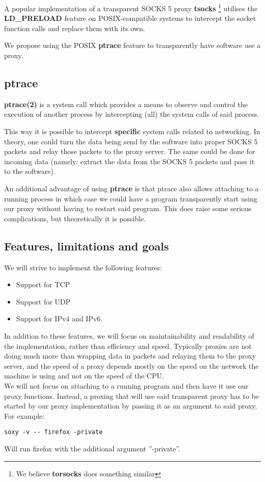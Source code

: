 \documentclass[a4paper]{article}
\begin{document}
A popular implementation of a transparent SOCKS 5 proxy \textbf{tsocks}
\footnote{We believe \textbf{torsocks} does something similar}
utilises the \textbf{LD\_PRELOAD} feature on POSIX-compatible systems to
intercept the socket function calls and replace them with its own.

We propose using the POSIX \textbf{ptrace} feature to transparently have
software use a proxy.

\subsection{ptrace}

\textbf{ptrace(2)} is a system call which provides a means to observe and
control the execution of another process by intercepting (all) the system calls
of said process.

This way it is possible to intercept \textbf{specific} system calls related to
networking. In theory, one could turn the data being send by the software into
proper SOCKS 5 packets and relay those packets to the proxy server. The same
could be done for incoming data (namely: extract the data from the SOCKS 5
packets and pass it to the software).

An additional advantage of using \textbf{ptrace} is that ptrace also allows
attaching to a running process in which case we could have a program
transparently start using our proxy without having to restart said program. This
does raise some serious complications, but theoretically it is possible.

\subsection{Features, limitations and goals}

We will strive to implement the following features:

\begin{itemize}
\item Support for TCP
\item Support for UDP
\item Support for IPv4 and IPv6.
\end{itemize}

In addition to these features, we will focus on maintainability and readability
of the implementation, rather than efficiency and speed. Typically proxies are
not doing much more than wrapping data in packets and relaying them to the proxy
server, and the speed of a proxy depends mostly on the speed on the network the
machine is using and not on the speed of the CPU. \\

We will not focus on attaching to a running program and then have it use our
proxy functions. %
Instead, a proxing that will use said transparent proxy has to be started by our
proxy implementation by passing it as an argument to said proxy. For example:

\begin{verbatim}
soxy -v -- firefox -private
\end{verbatim}

Will run firefox with the additional argument ''-private''.
\end{document}
